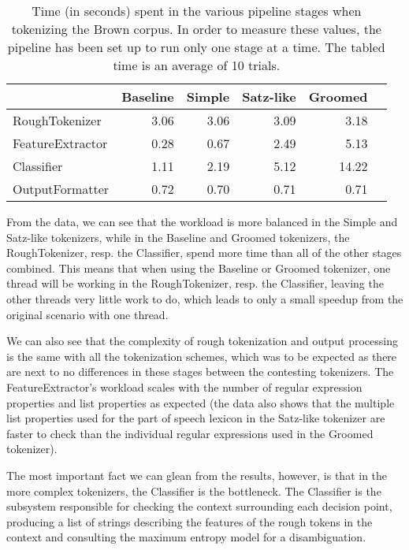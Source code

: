 \begin{table}
  \begin{center}
    \begin{tabular}{ | l | r | r | r | r | r | }
      \hline
      & Baseline & Simple & Satz-like & Groomed \\ \hline
      RoughTokenizer & 3.06 & 3.06 & 3.09 & 3.18 \\ \hline
      FeatureExtractor & 0.28 & 0.67 & 2.49 & 5.13 \\ \hline
      Classifier & 1.11 & 2.19 & 5.12 & 14.22 \\ \hline
      OutputFormatter & 0.72 & 0.70 & 0.71 & 0.71 \\
      \hline
    \end{tabular}
  \end{center}
  \caption[Time spent in individual pipeline elements]
    {Time (in seconds) spent in the various pipeline stages when tokenizing the
    Brown corpus. In order to measure these values, the pipeline has been set
    up to run only one stage at a time. The tabled time is an average of 10
    trials.}
  \label{tbl:bottlenecks}
\end{table}

From the data, we can see that the workload is more balanced in the Simple and
Satz-like tokenizers, while in the Baseline and Groomed tokenizers, the
RoughTokenizer, resp. the Classifier, spend more time than all of the other
stages combined. This means that when using the Baseline or Groomed tokenizer, one
thread will be working in the RoughTokenizer, resp. the Classifier, leaving the
other threads very little work to do, which leads to only a small speedup from
the original scenario with one thread.

We can also see that the complexity of rough tokenization and output processing
is the same with all the tokenization schemes, which was to be expected as
there are next to no differences in these stages between the contesting
tokenizers. The FeatureExtractor's workload scales with the number of regular
expression properties and list properties as expected (the data also shows that
the multiple list properties used for the part of speech lexicon in the
Satz-like tokenizer are faster to check than the individual regular expressions
used in the Groomed tokenizer).

The most important fact we can glean from the results, however, is that in the
more complex tokenizers, the Classifier is the bottleneck. The Classifier is
the subsystem responsible for checking the context surrounding each decision
point, producing a list of strings describing the features of the rough tokens
in the context and consulting the maximum entropy model for a disambiguation.

